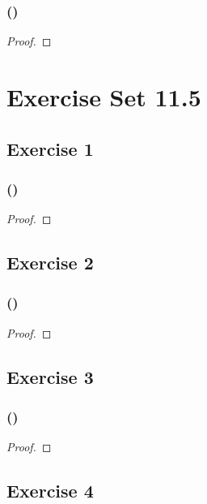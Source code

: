 \documentclass[14pt]{extarticle}
\begin{document}
\subsubsection{()}

\begin{proof}

\end{proof}

\section{Exercise Set 11.5}

\subsection{Exercise 1}

\subsubsection{()}

\begin{proof}

\end{proof}

\subsection{Exercise 2}

\subsubsection{()}

\begin{proof}

\end{proof}

\subsection{Exercise 3}

\subsubsection{()}

\begin{proof}

\end{proof}

\subsection{Exercise 4}
\end{document}
